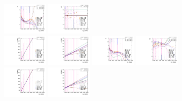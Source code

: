 \begin{figure}[htbp]
  \includegraphics[width=0.2\textwidth]{fig/2Dfit/paramSignalShape_allSig_MVV_LP_bb_LDy_ALPHA1.pdf}
  \includegraphics[width=0.2\textwidth]{fig/2Dfit/paramSignalShape_allSig_MVV_LP_bb_LDy_ALPHA2.pdf}\\
  \includegraphics[width=0.2\textwidth]{fig/2Dfit/paramSignalShape_allSig_MVV_HP_nobb_LDy_MEAN.pdf}
  \includegraphics[width=0.2\textwidth]{fig/2Dfit/paramSignalShape_allSig_MVV_HP_nobb_LDy_SIGMA.pdf}
  \includegraphics[width=0.2\textwidth]{fig/2Dfit/paramSignalShape_allSig_MVV_HP_nobb_LDy_ALPHA1.pdf}
  \includegraphics[width=0.2\textwidth]{fig/2Dfit/paramSignalShape_allSig_MVV_HP_nobb_LDy_ALPHA2.pdf}\\
  \includegraphics[width=0.2\textwidth]{fig/2Dfit/paramSignalShape_allSig_MVV_LP_nobb_LDy_MEAN.pdf}
  \includegraphics[width=0.2\textwidth]{fig/2Dfit/paramSignalShape_allSig_MVV_LP_nobb_LDy_SIGMA.pdf}

\end{figure}
